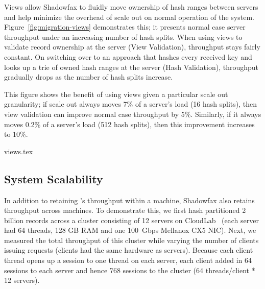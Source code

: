 Views allow Shadowfax to fluidly move ownership of hash ranges between
servers and help minimize the overhead of scale out on normal
operation of the system.
%
Figure~\ref{fig:migration-views} demonstrates this; it presents normal
case server throughput under an increasing number of hash splits.
%
When using views to validate record ownership at the
server (View Validation), throughput stays fairly constant.
%
On switching over to an approach that hashes every received key and
looks up a trie of owned hash ranges at the server (Hash Validation),
throughput gradually drops as the number of hash splits increase.

This figure shows the benefit of using views given a particular scale
out granularity; if scale out always moves 7\% of a server's load (16
hash splits), then view validation can improve normal case
throughput by 5\%.
%
Similarly, if it always moves 0.2\% of a server's load (512 hash
splits), then this improvement increases to 10\%.

 {views.tex}

\subsection{System Scalability}
\label{sec:eval:system-scalability}

%
In addition to retaining \faster's throughput within a machine,
Shadowfax also retains throughput across machines.
%
To demonstrate this, we first hash partitioned 2 billion records across a
cluster consisting of 12 servers on
CloudLab~\cite{cloudlab} (each server had 64 threads, 128 GB RAM and
one 100~Gbps Mellanox CX5 NIC).
%
Next, we measured the total throughput of this cluster while varying the
number
of clients issuing requests (clients had the same hardware as servers).
%
Because each client thread opens up a session to one thread on each server,
each client added in 64 sessions to each server and hence 768 sessions
to the cluster (64 threads/client * 12 servers).

